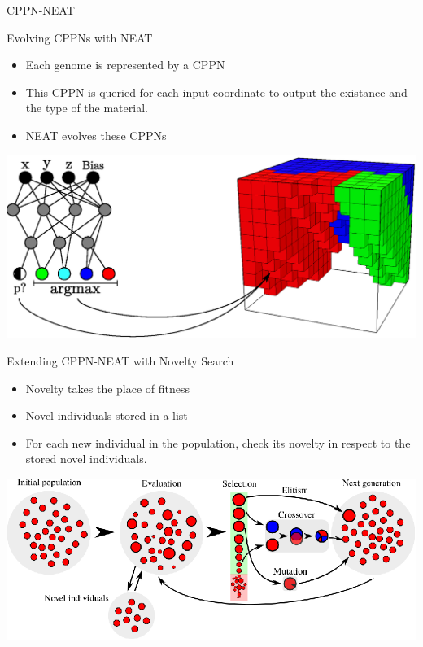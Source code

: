 \documentclass[6pt]{beamer}
\begin{document}
\begin{frame}{CPPN-NEAT}
\begin{block}{Evolving CPPNs with NEAT}
\begin{itemize}
\item Each genome is represented by a CPPN
\item This CPPN is queried for each input coordinate to output the existance and the type of the material.
\item NEAT evolves these CPPNs
\end{itemize}
\end{block}
\begin{center}
\includegraphics[height=0.45\textheight]{../Figures/Misc/cppnSoftBot.eps}
\end{center}
\end{frame}

{

\begin{frame}{Extending CPPN-NEAT with Novelty Search~}
\begin{itemize}
\item Novelty takes the place of fitness
\item Novel individuals stored in a list
\item For each new individual in the population, check its novelty in respect to the stored novel individuals.
\end{itemize}
\begin{center}
\includegraphics[height=0.45\textheight]{../Figures/Misc/EvolutionNovelty.eps}
\end{center}
\end{frame}

}
\end{document}
